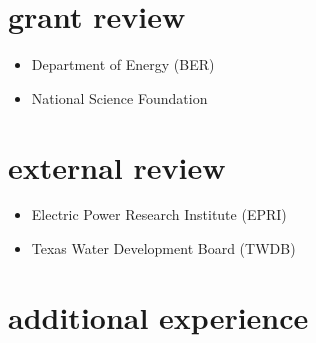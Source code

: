 \documentclass[10pt,oneside]{article}
\begin{document}

\section{grant review}

\mbox{}\vspace{-\dimexpr\baselineskip\relax}

\begin{itemize}[label={}]

  \item Department of Energy (BER)

  \item National Science Foundation

\end{itemize}


\section{external review}

\mbox{}\vspace{-\dimexpr\baselineskip\relax}

\begin{itemize}[label={}]

  \item Electric Power Research Institute (EPRI)

  \item Texas Water Development Board (TWDB)

\end{itemize}


\section{additional experience}

\mbox{}\vspace{-\dimexpr\baselineskip\relax}
\end{document}
